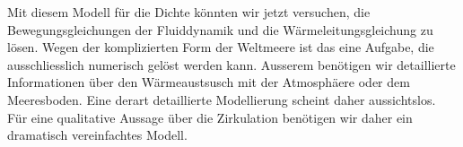 Mit diesem Modell für die Dichte könnten wir jetzt versuchen, die
Bewegungsgleichungen der Fluiddynamik und die Wärmeleitungsgleichung
zu lösen.
Wegen der komplizierten Form der Weltmeere ist das eine Aufgabe,
die ausschliesslich numerisch gelöst werden kann.
Ausserem benötigen wir detaillierte Informationen über den Wärmeaustsusch
mit der Atmosphäere oder dem Meeresboden.
Eine derart detaillierte Modellierung scheint daher aussichtslos.
Für eine qualitative Aussage über die Zirkulation benötigen wir daher
ein dramatisch vereinfachtes Modell.





